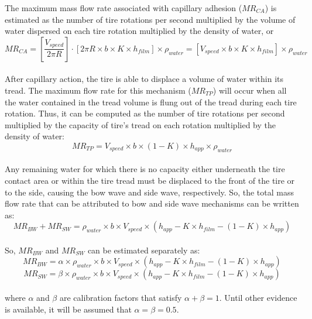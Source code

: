 \documentclass[12pt]{article}
\begin{document}
The maximum mass flow rate associated with capillary adhesion ($MR_{CA}$) is estimated as the number of tire rotations per second multiplied by the volume of water dispersed on each tire rotation multiplied by the density of water, or
 \[ 
MR_{CA} = \left[\frac{V_{speed}}{2\pi R}\right] \cdot \left[ 2\pi R \times b \times K \times h_{film} \right] \times \rho_{water} = \left[V_{speed} \times b \times K \times h_{film} \right] \times  \rho_{water} 
\]
\\
After capillary action, the tire is able to displace a volume of water within its tread. The maximum flow rate for this mechanism ($MR_{TP}$) will occur when all the water contained in the tread volume is flung out of the tread during each tire rotation. Thus, it can be computed as the number of tire rotations per second multiplied by the capacity of tire’s tread on each rotation multiplied by the density of water:
 \[ 
MR_{TP} = V_{speed} \times b \times (1-K) \times h_{app} \times \rho_{water} 
\]
\\
Any remaining water for which there is no capacity either underneath the tire contact area or within the tire tread must be displaced to the front of the tire or to the side, causing the bow wave and side wave, respectively. So, the total mass flow rate that can be attributed to bow and side wave mechanisms can be written as:
 \[ 
MR_{BW} + MR_{SW} =  \rho_{water} \times b \times V_{speed} \times (h_{app} - K \times h_{film} - (1-K) \times h_{app}) \]
\\
So, $MR_{BW}$ and $MR_{SW}$ can be estimated separately as:
 \[ 
MR_{BW} =  \alpha \times \rho_{water} \times b \times V_{speed} \times (h_{app} - K \times h_{film} - (1-K) \times h_{app}) \]
 \[
MR_{SW} = \beta \times \rho_{water} \times b \times V_{speed} \times (h_{app} - K \times h_{film} - (1-K) \times h_{app}) \]
\\
where $\alpha$ and $\beta$ are calibration factors that satisfy $\alpha + \beta = 1$. Until other evidence is available, it will be assumed that $\alpha = \beta = 0.5$.
\end{document}
